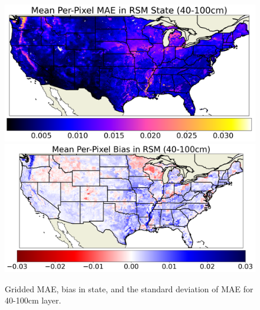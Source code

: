 \begin{figure}[hp!]
    \centering

    \includegraphics[width=.48\linewidth,draft=false]{figures/grid-eval_lstm-rsm-9_full/eval-grid_full_lstm-rsm-9_rsm-100_spatial-stats_abs-err_state-err-abs-mean.png}
    \includegraphics[width=.48\linewidth,draft=false]{figures/grid-eval_lstm-rsm-9_full/eval-grid_full_lstm-rsm-9_rsm-100_spatial-stats_bias_state-err-bias-mean.png}


    \caption{Gridded MAE, bias in state, and the standard deviation of MAE for 40-100cm layer.}
    \label{lstm-rsm-9-grid-rsm-100}
\end{figure}
